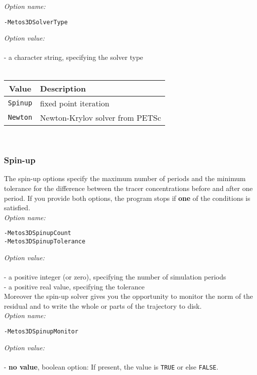 \documentclass{article}
\begin{document}
\emph{Option name:}
\begin{verbatim}
-Metos3DSolverType
\end{verbatim}

\emph{Option value:} \\
\vspace{-0.3cm}\\
- a character string, specifying the solver type \\
\\
\begin{tabular}{c|l}
Value & Description \\ \hline
\texttt{Spinup} & fixed point iteration \\
\texttt{Newton} & Newton-Krylov solver from PETSc
\end{tabular} \\

\subsubsection{Spin-up}

The spin-up options specify the maximum number of periods
and the minimum tolerance for the difference between the
tracer concentrations before and after one period.
If you provide both options, the program stops if \textbf{one} of the conditions
is satisfied. \\

\emph{Option name:}
\begin{verbatim}
-Metos3DSpinupCount
-Metos3DSpinupTolerance
\end{verbatim}

\emph{Option value:} \\
\vspace{-0.3cm}\\
- a positive integer (or zero), specifying the number of simulation periods \\
- a positive real value, specifying the tolerance \\

Moreover the spin-up solver gives you the opportunity to monitor the
norm of the residual and to write the whole or parts of the trajectory to disk. \\

\emph{Option name:}
\begin{verbatim}
-Metos3DSpinupMonitor
\end{verbatim}

\emph{Option value:} \\
\vspace{-0.3cm}\\
- \textbf{no value}, boolean option: If present, the value is \texttt{TRUE} or else \texttt{FALSE}. \\
\end{document}
